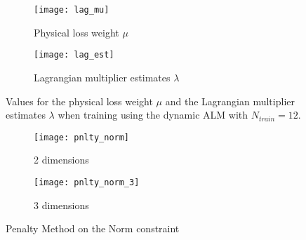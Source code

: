 \begin{table}[H]
	\centering
	\caption{Test MSE Loss statistics for 10 random training sets and $N_{train} = 20$}
	\label{table_stats_20}
\end{table}


\begin{figure}[H]
	\centering
	\begin{subfigure}{.5\textwidth}
		\centering
		\texttt{[image: lag\_mu]}
		\caption{Physical loss weight $\mu$}
	\end{subfigure}%
	\begin{subfigure}{.5\textwidth}
		\centering
		\texttt{[image: lag\_est]}
		\caption{Lagrangian multiplier estimates $\lambda$}
	\end{subfigure}
	\caption{Values for the physical loss weight $\mu$ and the Lagrangian multiplier estimates $\lambda$ when training using the dynamic ALM with $N_{train} = 12$.}
	\label{fig:mu_lambda_alm_dyn}
\end{figure}


\begin{figure}[H]
	\centering
	\begin{subfigure}{.5\textwidth}
		\centering
		\texttt{[image: pnlty\_norm]}
		\caption{2 dimensions}
	\end{subfigure}%
	\begin{subfigure}{.5\textwidth}
		\centering
		\texttt{[image: pnlty\_norm\_3]}
		\caption{3 dimensions}
	\end{subfigure}
	\caption{Penalty Method on the Norm constraint}
	\label{fig:pnlny_norm}
\end{figure}


